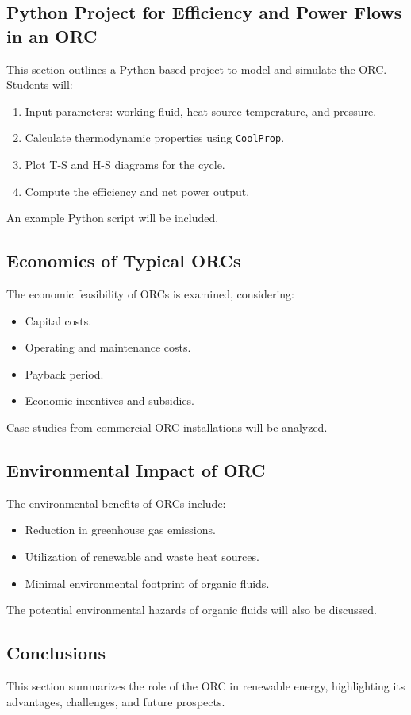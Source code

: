 \documentclass[11pt]{article}
\begin{document}
\subsection{Python Project for Efficiency and Power Flows in an ORC}
This section outlines a Python-based project to model and simulate the ORC. Students will:
\begin{enumerate}
    \item Input parameters: working fluid, heat source temperature, and pressure.
    \item Calculate thermodynamic properties using \texttt{CoolProp}.
    \item Plot T-S and H-S diagrams for the cycle.
    \item Compute the efficiency and net power output.
\end{enumerate}
An example Python script will be included.

\subsection{Economics of Typical ORCs}
The economic feasibility of ORCs is examined, considering:
\begin{itemize}
    \item Capital costs.
    \item Operating and maintenance costs.
    \item Payback period.
    \item Economic incentives and subsidies.
\end{itemize}
Case studies from commercial ORC installations will be analyzed.

\subsection{Environmental Impact of ORC}
The environmental benefits of ORCs include:
\begin{itemize}
    \item Reduction in greenhouse gas emissions.
    \item Utilization of renewable and waste heat sources.
    \item Minimal environmental footprint of organic fluids.
\end{itemize}
The potential environmental hazards of organic fluids will also be discussed.

\subsection{Conclusions}
This section summarizes the role of the ORC in renewable energy, highlighting its advantages, challenges, and future prospects.
\end{document}
